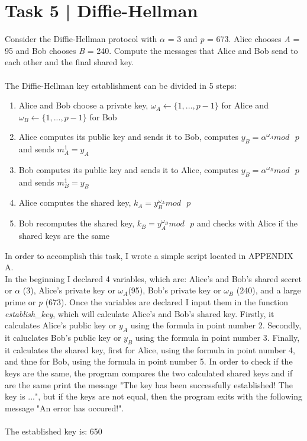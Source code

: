 \documentclass{article}
\begin{document}
\section*{Task 5 | Diffie-Hellman}
Consider the Diffie-Hellman protocol with $\alpha$ = 3 and \textit{p} = 673. Alice chooses
\textit{A} = 95 and Bob chooses \textit{B} = 240. Compute the messages that Alice and Bob
send to each other and the final shared key. \\\\
The Diffie-Hellman key establishment can be divided in 5 steps:
\begin{enumerate} 
    \item Alice and Bob choose a private key,
        $\omega_A\leftarrow \{1, ..., p - 1\}$ for Alice and $\omega_B\leftarrow \{1, ..., p - 1\}$ for Bob
    \item Alice computes its public key and sends it to Bob, computes $y_B = \alpha^{\omega_A} mod\text{  }p$ 
        and sends $m_A^1 = y_A$
    \item Bob computes its public key and sends it to Alice, computes $y_B = \alpha^{\omega_B} mod\text{  }p$ 
        and sends $m_B^1 = y_B$
    \item Alice computes the shared key, $k_A = y_B^{\omega_A} mod \text{  }p$
    \item Bob recomputes the shared key, $k_B = y_A^{\omega_B} mod \text{  }p$ and checks 
        with Alice if the shared keys are the same
\end{enumerate}
In order to accomplish this task, I wrote a simple script located in APPENDIX A. \\
In the beginning I declared 4 variables, which are: Alice's and Bob's shared secret
or $\alpha$ (3), Alice's private key or $\omega_A$(95), Bob's private key or $\omega_B$
(240), and a large prime or \textit{p} (673). Once the variables are declared I input
them in the function \textit{establish\_key}, which will calculate Alice's and Bob's shared key.
Firstly, it calculates Alice's public key or $y_A$ using the formula in point number 2.
Secondly, it caluclates Bob's public key or $y_B$ using the formula in point number 3.
Finally, it calculates the shared key, first for Alice, using the formula in point number 4, and
thne for Bob, using the formula in point number 5. In order to check if the keys
are the same, the program compares the two calculated shared keys and if are the 
same print the message "The key has been successfully established! The key is ...", but 
if the keys are not equal, then the program exits with the following message "An error has occured!". \\\\
The established key is: 650
\end{document}
